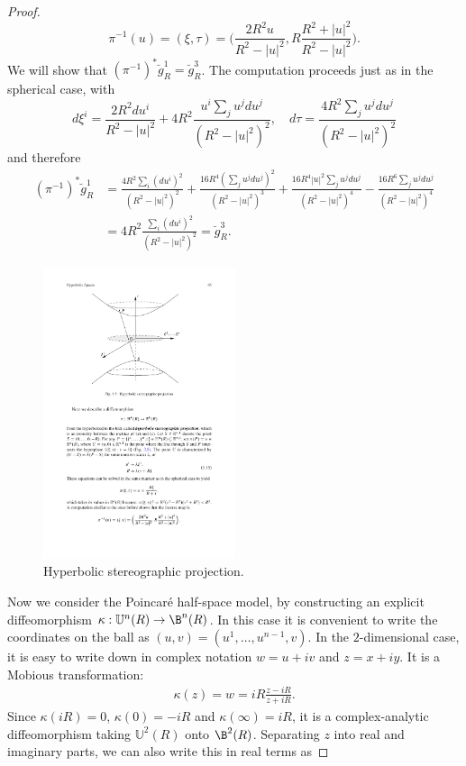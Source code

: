 \begin{proof}
\[\pi^{-1}(u)=(\xi,\tau)=\Big(\frac{2R^2u}{R^2-|u|^2},R\frac{R^2+|u|^2}{R^2-|u|^2}\Big).\]
We will show that $(\pi^{-1})^*\breve{g}^1_R=\breve{g}^3_R$. The computation proceeds just as in the spherical case, with
\[d\xi^i=\frac{2R^2du^i}{R^2-|u|^2}+4R^2\frac{u^i\sum_ju^jdu^j}{(R^2-|u|^2)^2},\quad d\tau=\frac{4R^2\sum_ju^jdu^j}{(R^2-|u|^2)^2}\]
and therefore
\begin{align*}
(\pi^{-1})^*\breve{g}^1_R&=\frac{4R^2\sum_i(du^i)^2}{(R^2-|u|^2)^2}+\frac{16R^4(\sum_ju^jdu^j)^2}{(R^2-|u|^2)^3}+\frac{16R^4|u|^2\sum_ju^jdu^j}{(R^2-|u|^2)^4}-\frac{16R^6\sum_ju^jdu^j}{(R^2-|u|^2)^4}\\
&=4R^2\frac{\sum_i(du^i)^2}{(R^2-|u|^2)^2}=\breve{g}^3_R.
\end{align*}
\begin{figure}[htbp]
\centering
\includegraphics[width=160pt]{pictures/hyperbolic-stereographic-projection}
\caption{Hyperbolic stereographic projection.}
\label{Hyperbolic stereographic proj}
\end{figure}
Now we consider the Poincar\'e half-space model, by constructing an explicit diffeomorphism $\kappa:\mathbb{U}^n(R)\to\B^n(R)$.
In this case it is convenient to write the coordinates on the ball as $(u,v)=(u^1,\dots,u^{n-1},v)$. In the $2$-dimensional case, it is easy to write down in complex notation $w=u+iv$ and $z=x+iy$. It is a Mobious transformation:
\begin{align}\label{Hyperbolic space-1}
\kappa(z)=w=iR\frac{z-iR}{z+iR}.
\end{align}
Since $\kappa(iR)=0$, $\kappa(0)=-iR$ and $\kappa(\infty)=iR$, it is a complex-analytic diffeomorphism taking $\mathbb{U}^2(R)$ onto $\B^2(R)$. Separating $z$ into real and imaginary parts, we can also write this in real terms as

\end{proof}
